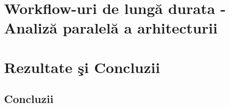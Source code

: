 \documentclass[a4paper,12pt]{report}
\begin{document}
\chapter{Workflow-uri de lungă durata - Analiză paralelă a arhitecturii}

\chapter {Rezultate şi Concluzii}

\section{Concluzii}


\listoffigures
\listoftables

\end{document}
